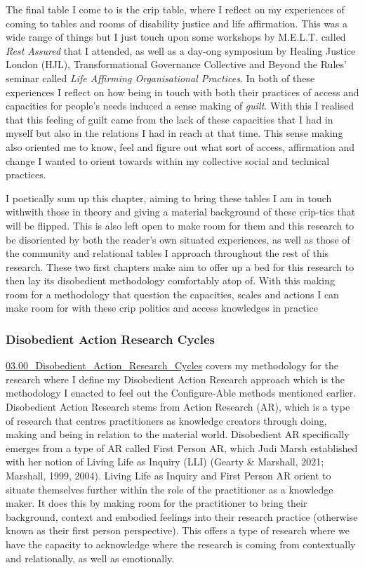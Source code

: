 The final table I come to is the crip table, where I reflect on my
experiences of coming to tables and rooms of disability justice and life
affirmation. This was a wide range of things but I just touch upon some
workshops by M.E.L.T. called \emph{Rest Assured} that I attended, as
well as a day-ong symposium by Healing Justice London (HJL),
Transformational Governance Collective and Beyond the Rules' seminar
called \emph{Life Affirming Organisational Practices}. In both of these
experiences I reflect on how being in touch with both their practices of
access and capacities for people's needs induced a sense making of
\emph{guilt}. With this I realised that this feeling of guilt came from
the lack of these capacities that I had in myself but also in the
relations I had in reach at that time. This sense making also oriented
me to know, feel and figure out what sort of access, affirmation and
change I wanted to orient towards within my collective social and
technical practices.

I poetically sum up this chapter, aiming to bring these tables I am in
touch withwith those in theory and giving a material background of these
crip-tics that will be flipped. This is also left open to make room for
them and this research to be disoriented by both the reader's own
situated experiences, as well as those of the community and relational
tables I approach throughout the rest of this research. These two first
chapters make aim to offer up a bed for this research to then lay its
disobedient methodology comfortably atop of. With this making room for a
methodology that question the capacities, scales and actions I can make
room for with these crip politics and access knowledges in practice

\hypertarget{disobedient-action-research-cycles}{%
\subsubsection{Disobedient Action Research
Cycles}\label{disobedient-action-research-cycles}}

\href{../../03_Disobedient_Action_Research_Cycles/sections/03.00_Disobedient_Action_Research_Cycles.md}{03.00\_Disobedient\_Action\_Research\_Cycles}
covers my methodology for the research where I define my Disobedient
Action Research approach which is the methodology I enacted to feel out
the Configure-Able methods mentioned earlier. Disobedient Action
Research stems from Action Research (AR), which is a type of research
that centres practitioners as knowledge creators through doing, making
and being in relation to the material world. Disobedient AR specifically
emerges from a type of AR called First Person AR, which Judi Marsh
established with her notion of Living Life as Inquiry (LLI) (Gearty \&
Marshall, 2021; Marshall, 1999, 2004). Living Life as Inquiry and First
Person AR orient to situate themselves further within the role of the
practitioner as a knowledge maker. It does this by making room for the
practitioner to bring their background, context and embodied feelings
into their research practice (otherwise known as their first person
perspective). This offers a type of research where we have the capacity
to acknowledge where the research is coming from contextually and
relationally, as well as emotionally.

